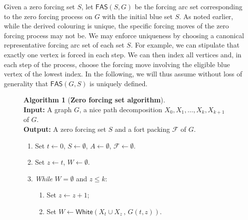 \documentclass[12pt]{amsart}
\theoremstyle{plain}
\theoremstyle{definition}
\newtheorem{algorithm}[definition]{Algorithm}
\def\F{\mathcal F}
\newcommand{\white}{\mathsf{White}}
\newcommand{\fas}{\mathsf{FAS}}
\begin{document}
Given a zero forcing set $S$, let $\fas(S, G)$ be the forcing arc set corresponding to the zero forcing process on $G$ with the initial blue set $S$.
As noted earlier, while the derived colouring is unique, the specific forcing moves of the zero forcing process may not be. We may enforce uniqueness by choosing a canonical representative forcing arc set of each set $S$. For example, we can stipulate that exactly one vertex is forced in each step. We can then index all vertices and, in each step of the process, choose the forcing move involving the eligible blue vertex of the lowest index. In the following, we will thus assume without loss of generality that $\fas(G,S)$ is uniquely defined.


\begin{figure}[ht]
\begin{mdframed}[style=MyFrame,align=center]

{\flushleft
\begin{algorithm}[{\bf Zero forcing set algorithm}]\label{algorithm}
\ \\ 

\textbf{Input:} A graph $G$, a nice path decomposition $X_0, X_1,\dots, X_k,X_{k+1}$ of $G$. \\
\textbf{Output:} A zero forcing set $S$ and a fort packing $\F$ of $G$. \\
\setcounter{algct}{1}
\begin{enumerate}[label=(L\thealgct)]
    \item  Set $t\leftarrow 0$, $S\leftarrow\emptyset$, $A\leftarrow\emptyset$, $\F\leftarrow\emptyset$. 
    \item\label{line:back2} Set $z\leftarrow t$, $W\leftarrow \emptyset$.
    \item\label{line:loop} \emph{While} $W=\emptyset$ and ${z\leq k}$:  
    \begin{enumerate}[label=(L\thealgct\alph*)]
        \item Set $z\leftarrow z+1$;
        \item\label{line:W} Set $W\leftarrow \white(X_t\cup X_z\,,\, G(t,z))$.
    \end{enumerate} 


\end{enumerate}
\end{algorithm}}
\end{mdframed}
\end{figure}
\end{document}
